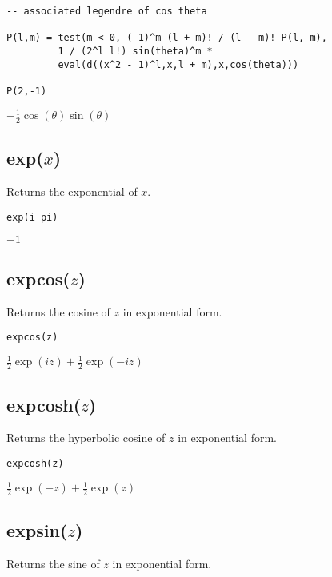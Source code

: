 \documentclass[12pt]{article}
\begin{document}
{\color{blue}
\begin{verbatim}
-- associated legendre of cos theta

P(l,m) = test(m < 0, (-1)^m (l + m)! / (l - m)! P(l,-m),
         1 / (2^l l!) sin(theta)^m *
         eval(d((x^2 - 1)^l,x,l + m),x,cos(theta)))

P(2,-1)
\end{verbatim}
}

$\displaystyle
-\tfrac{1}{2}\cos(\theta)\sin(\theta)
$

\subsection*{exp($x$)}

Returns the exponential of $x$.

{\color{blue}
\begin{verbatim}
exp(i pi)
\end{verbatim}
}

\noindent
$-1$

\subsection*{expcos($z$)}

Returns the cosine of $z$ in exponential form.

{\color{blue}
\begin{verbatim}
expcos(z)
\end{verbatim}
}

\noindent
$\displaystyle \tfrac{1}{2}\exp(iz)+\tfrac{1}{2}\exp(-iz)$

\subsection*{expcosh($z$)}

Returns the hyperbolic cosine of $z$ in exponential form.

{\color{blue}
\begin{verbatim}
expcosh(z)
\end{verbatim}
}

\noindent
$\displaystyle \tfrac{1}{2}\exp(-z)+\tfrac{1}{2}\exp(z)$

\subsection*{expsin($z$)}

Returns the sine of $z$ in exponential form.
\end{document}
